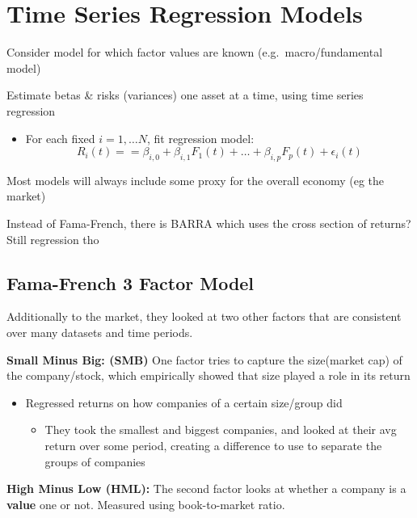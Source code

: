\documentclass[
  oneside]{book}
\providecommand{\tightlist}{%
  \setlength{\itemsep}{0pt}\setlength{\parskip}{0pt}}
\begin{document}
\hypertarget{time-series-regression-models}{%
\section{Time Series Regression Models}\label{time-series-regression-models}}

Consider model for which factor values are known (e.g.~macro/fundamental model)

Estimate betas \& risks (variances) one asset at a time, using time series regression

\begin{itemize}
\tightlist
\item
  For each fixed \(i=1,\dots N\), fit regression model:
  \[
  R_{i}(t) = = \beta_{i,0} + \beta_{i,1}F_{1}(t)+ \dots + \beta_{i,p}F_{p}(t) + \epsilon_{i}(t)
  \]
\end{itemize}

Most models will always include some proxy for the overall economy (eg the market)

Instead of Fama-French, there is BARRA which uses the cross section of returns? Still regression tho

\hypertarget{fama-french-3-factor-model}{%
\subsection{Fama-French 3 Factor Model}\label{fama-french-3-factor-model}}

Additionally to the market, they looked at two other factors that are consistent over many datasets and time periods.

\textbf{Small Minus Big: (SMB)}
One factor tries to capture the size(market cap) of the company/stock, which empirically showed that size played a role in its return

\begin{itemize}
\tightlist
\item
  Regressed returns on how companies of a certain size/group did

  \begin{itemize}
  \tightlist
  \item
    They took the smallest and biggest companies, and looked at their avg return over some period, creating a difference to use to separate the groups of companies
  \end{itemize}
\end{itemize}

\textbf{High Minus Low (HML):}
The second factor looks at whether a company is a \textbf{value} one or not. Measured using book-to-market ratio.
\end{document}
